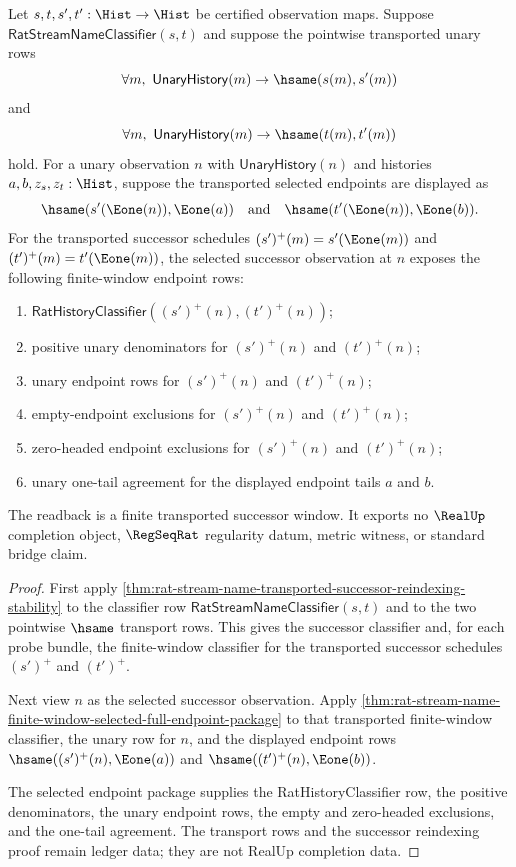 \begin{theorem}
\label{thm:streamname-transported-successor-selected-endpoint-readback}
Let $s,t,s',t':\Hist\to\Hist$ be certified observation maps. Suppose
$\mathsf{RatStreamNameClassifier}(s,t)$ and suppose the pointwise transported
unary rows
$$
\forall m,\ \mathsf{UnaryHistory}(m)\to\hsame(s(m),s'(m))
$$
and
$$
\forall m,\ \mathsf{UnaryHistory}(m)\to\hsame(t(m),t'(m))
$$
hold. For a unary observation $n$ with $\mathsf{UnaryHistory}(n)$ and histories
$a,b,z_s,z_t:\Hist$, suppose the transported selected endpoints are displayed
as
$$
\hsame(s'(\Eone(n)),\Eone(a))
\quad\text{and}\quad
\hsame(t'(\Eone(n)),\Eone(b)).
$$
For the transported successor schedules $(s')^{+}(m)=s'(\Eone(m))$ and
$(t')^{+}(m)=t'(\Eone(m))$, the selected successor observation at $n$ exposes
the following finite-window endpoint rows:
\begin{enumerate}
  \item $\mathsf{RatHistoryClassifier}((s')^{+}(n),(t')^{+}(n))$;
  \item positive unary denominators for $(s')^{+}(n)$ and $(t')^{+}(n)$;
  \item unary endpoint rows for $(s')^{+}(n)$ and $(t')^{+}(n)$;
  \item empty-endpoint exclusions for $(s')^{+}(n)$ and $(t')^{+}(n)$;
  \item zero-headed endpoint exclusions for $(s')^{+}(n)$ and $(t')^{+}(n)$;
  \item unary one-tail agreement for the displayed endpoint tails $a$ and $b$.
\end{enumerate}
The readback is a finite transported successor window. It exports no
$\RealUp$ completion object, $\RegSeqRat$ regularity datum, metric witness, or
standard bridge claim.
\end{theorem}
\begin{proof}
First apply
\autoref{thm:rat-stream-name-transported-successor-reindexing-stability} to
the classifier row $\mathsf{RatStreamNameClassifier}(s,t)$ and to the two
pointwise $\hsame$ transport rows. This gives the successor classifier and,
for each probe bundle, the finite-window classifier for the transported
successor schedules $(s')^{+}$ and $(t')^{+}$.

Next view $n$ as the selected successor observation. Apply
\autoref{thm:rat-stream-name-finite-window-selected-full-endpoint-package} to
that transported finite-window classifier, the unary row for $n$, and the
displayed endpoint rows
$\hsame((s')^{+}(n),\Eone(a))$ and
$\hsame((t')^{+}(n),\Eone(b))$.

The selected endpoint package supplies the RatHistoryClassifier row, the
positive denominators, the unary endpoint rows, the empty and zero-headed
exclusions, and the one-tail agreement. The transport rows and the successor
reindexing proof remain ledger data; they are not RealUp completion data.
\end{proof}

